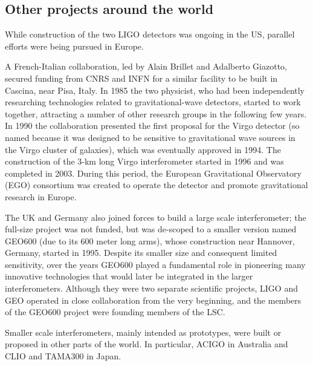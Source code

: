 \subsection{Other projects around the world}
While construction of the two LIGO detectors was ongoing in the US, parallel efforts were being pursued in Europe.

A French-Italian collaboration, led by Alain Brillet and Adalberto Giazotto, secured funding from CNRS and INFN for a similar facility to be built in Cascina, near Pisa, Italy.
In 1985 the two physicist, who had been independently researching technologies related to gravitational-wave detectors, started to work together, attracting a number of other research groups in the following few years.
In 1990 the collaboration presented the first proposal for the Virgo detector (so named because it was designed to be sensitive to gravitational wave sources in the Virgo cluster of galaxies), which was eventually approved in 1994.
The construction of the 3-km long Virgo interferometer started in 1996 and was completed in 2003.
During this period, the European Gravitational Observatory (EGO) consortium was created to operate the detector and promote gravitational research in Europe.

The UK and Germany also joined forces to build a large scale interferometer; the full-size project was not funded, but was de-scoped to a smaller version named GEO600 (due to its 600 meter long arms), whose construction near Hannover, Germany, started in 1995.
Despite its smaller size and consequent limited sensitivity, over the years GEO600 played a fundamental role in pioneering many innovative technologies that would later be integrated in the larger interferometers.
Although they were two separate scientific projects, LIGO and GEO operated in close collaboration from the very beginning, and the members of the GEO600 project were founding members of the LSC.

Smaller scale interferometers, mainly intended as prototypes, were built or 
proposed in other parts of the world. In particular, ACIGO in Australia and 
CLIO and TAMA300 in Japan. 

